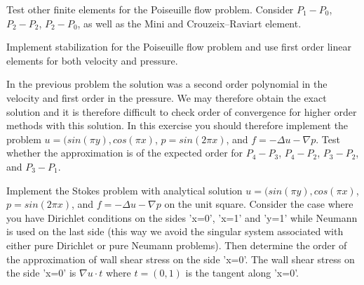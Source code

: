 \begin{exercise}
Test other finite elements for the Poiseuille flow problem. Consider $P_1-P_0$, $P_2-P_2$, $P_2-P_0$, as
well as the Mini and Crouzeix--Raviart element.
\end{exercise}

\begin{exercise}
Implement stabilization for the Poiseuille flow problem and use first order linear elements
for both velocity and pressure.
\end{exercise}

\begin{exercise}
In the previous problem the solution was a second order polynomial in the velocity and
first order in the pressure. We may therefore obtain the exact solution and it
is therefore difficult to check order of convergence for higher order methods with
this solution. In this exercise you should therefore
implement the problem $u=(sin(\pi y), cos( \pi x)$, $p=sin(2 \pi x)$, and $f = -\Delta u - \nabla p$.
Test whether the approximation is of the expected order for $P_4-P_3$, $P_4-P_2$, $P_3-P_2$, and $P_3-P_1$.

\end{exercise}

\begin{exercise}
Implement the Stokes problem with analytical solution $u=(sin(\pi y), cos( \pi x)$, $p=sin(2 \pi x)$, and $f = -\Delta u - \nabla p$ 
on the unit square.  Consider the case where you have Dirichlet conditions on the sides
'x=0', 'x=1' and 'y=1' while Neumann is used on the last side (this way we avoid the 
singular system associated with either pure Dirichlet or pure Neumann problems).    
Then determine the order of the approximation of wall shear stress on the side 'x=0'. 
The wall shear stress on the side 'x=0' is $\nabla u \cdot t$ where $t=(0,1)$ is the tangent along 'x=0'.
\end{exercise}






